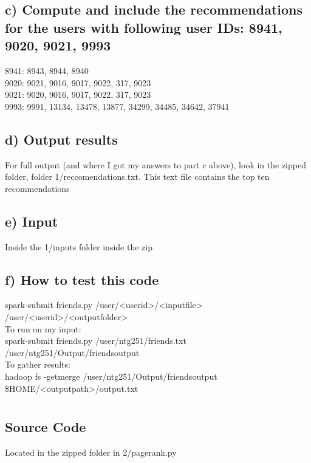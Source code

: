 \subsection*{c) Compute and include the recommendations for the users with following user IDs: 8941, 9020, 9021, 9993}
8941: 8943, 8944, 8940
\\
9020: 9021, 9016, 9017, 9022, 317, 9023
\\
9021: 9020, 9016, 9017, 9022, 317, 9023
\\
9993: 9991, 13134, 13478, 13877, 34299, 34485, 34642, 37941
\\

\subsection*{d) Output results}
For full output (and where I got my answers to part c above), look in the zipped folder, folder 1/reccomendations.txt. This text file contains the top ten recommendations 

\subsection*{e) Input}
Inside the 1/inputs folder inside the zip

\subsection*{f) How to test this code}
spark-submit friends.py /user/<userid>/<inputfile> /user/<userid>/<outputfolder>
\\
To run on my input:\\
spark-submit friends.py /user/ntg251/friends.txt /user/ntg251/Output/friendsoutput
\\
To gather results:\\
hadoop fs -getmerge /user/ntg251/Output/friendsoutput \$HOME/<outputpath>/output.txt

\section*{}

\subsection*{Source Code}
Located in the zipped folder in 2/pagerank.py


